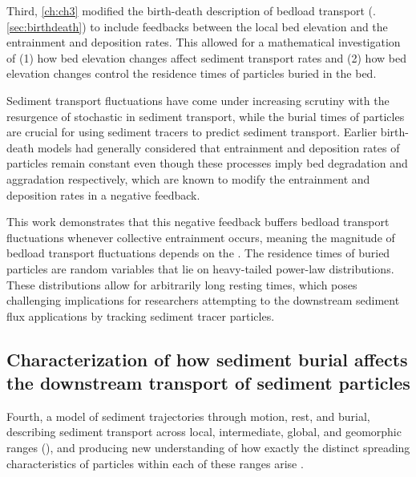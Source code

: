 Third, \DIFdelbegin {}\DIFdelend \DIFaddbegin {}\DIFaddend \ref{ch:ch3} modified the birth-death description of bedload transport (\DIFdelbegin {}\DIFdelend \DIFaddbegin {}\DIFaddend . \ref{sec:birthdeath}) to include feedbacks between the local bed elevation and the entrainment and deposition rates.
This allowed for a mathematical investigation of (1) how bed elevation changes affect sediment transport rates and (2) how bed elevation changes control the residence times of particles buried in the bed.
\DIFaddbegin 

\DIFaddend Sediment transport fluctuations have come under increasing scrutiny with the resurgence of stochastic \DIFdelbegin {}\DIFdelend \DIFaddbegin {}\DIFaddend in sediment transport, while the burial times of particles are crucial for using sediment tracers to predict sediment transport.
Earlier birth-death models had generally considered that entrainment and deposition rates of particles remain constant even though these processes imply bed degradation and aggradation respectively, which are known to modify the entrainment and deposition rates in a negative feedback.

This work demonstrates that this negative feedback buffers bedload transport fluctuations whenever collective entrainment occurs, meaning the magnitude of bedload transport fluctuations depends on the \DIFdelbegin {}\DIFdelend \DIFaddbegin {}\DIFaddend . The residence times of buried particles are random variables that lie on heavy-tailed power-law distributions. These distributions allow for arbitrarily long resting times, which poses challenging implications for researchers attempting to \DIFdelbegin {}\DIFdelend \DIFaddbegin {}\DIFaddend the downstream sediment flux \DIFdelbegin {}\DIFdelend \DIFaddbegin {}\DIFaddend applications by tracking sediment tracer particles. 

\subsection{Characterization of how sediment burial affects the downstream transport of sediment particles}

Fourth, \DIFdelbegin {}\DIFdelend \DIFaddbegin {}\DIFaddend a model of sediment trajectories through motion, rest, and burial, describing sediment transport across local, intermediate, global, and geomorphic ranges (\DIFaddbegin {}\DIFaddend ), and producing new understanding of how exactly the distinct spreading characteristics of particles within each of these ranges arise \citep[e.g][]{Pretzlav2021}.

